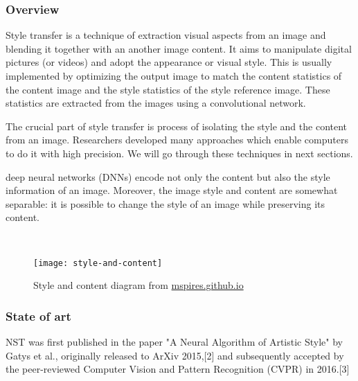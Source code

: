 \documentclass[../Main.tex]{subfiles}
\begin{document}
    \subsubsection{Overview}
    Style transfer is a technique of extraction visual aspects from an image and blending it together with an another image content. It aims to manipulate digital pictures (or videos) and adopt the appearance or visual style. This is usually implemented by optimizing the output image to match the content statistics of the content image and the style statistics of the style reference image. These statistics are extracted from the images using a convolutional network. 
    
    The crucial part of style transfer is process of isolating the style and the content from an image. Researchers developed many approaches which enable computers to do it with high precision. We will go through these techniques in next sections. 
    
    deep
neural networks (DNNs) encode not only the content but
also the style information of an image. Moreover, the image style and content are somewhat separable: it is possible
to change the style of an image while preserving its content.
    
    \\
    \begin{figure}[h]
        \centering
        \texttt{[image: style-and-content]}
        \caption{Style and content diagram from \href{https://mspries.github.io/OpticalIllusionReportPage.html}{mspires.github.io}}
        \label{fig:style-and-content}
    \end{figure}

    \subsubsection{State of art}
    NST was first published in the paper "A Neural Algorithm of Artistic Style" by Gatys et al., originally released to ArXiv 2015,[2] and subsequently accepted by the peer-reviewed Computer Vision and Pattern Recognition (CVPR) in 2016.[3]
    
\end{document}
